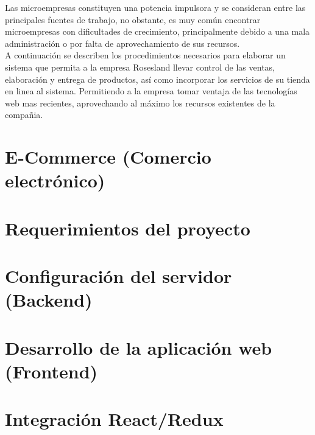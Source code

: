 Las microempresas constituyen una potencia impulsora y se consideran entre las principales fuentes de trabajo, no obstante, es muy común encontrar microempresas con dificultades de crecimiento, principalmente debido a una mala administración o por falta de aprovechamiento de sus recursos. \\[0.8cm]
A continuación se describen los procedimientos necesarios para elaborar un sistema que permita a la empresa Rosesland llevar control de las ventas, elaboración y entrega de productos, así como incorporar los servicios de su tienda en linea al sistema. Permitiendo a la empresa tomar ventaja de las tecnologías web mas recientes, aprovechando al máximo los recursos existentes de la compañia.

\section{E-Commerce (Comercio electrónico)}


\section{Requerimientos del proyecto}


\newpage
\section{Configuración del servidor (Backend)}


\newpage
\section{Desarrollo de la aplicación web (Frontend)}


\newpage
\section{Integración React/Redux}

